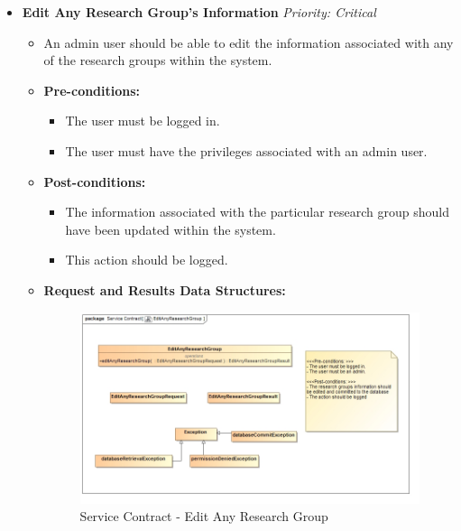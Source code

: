 \documentclass{article}
\begin{document}
\begin{itemize}
					\cleardoublepage
					\item \textbf{Edit Any Research Group's Information} \hfill \textit{Priority: Critical}
					\begin{itemize}
						\item An admin user should be able to edit the information associated with any of the research groups within the system.
						\item \textbf{Pre-conditions:}
						\begin{itemize}
							\item The user must be logged in.
							\item The user must have the privileges associated with an admin user.
						\end{itemize}
						\item \textbf{Post-conditions:}
						\begin{itemize}
							\item The information associated with the particular research group should have been updated within the system.
							\item This action should be logged.
						\end{itemize}
						\item \textbf{Request and Results Data Structures:}
						\begin{figure}[H]
							\includegraphics[width=\linewidth]{../Diagrams/ServiceContracts/Group control subsystem/EditAnyResearchGroup.jpg}
							\caption{Service Contract - Edit Any Research Group}
						\end{figure}
					\end{itemize}


\end{itemize}
\end{document}
